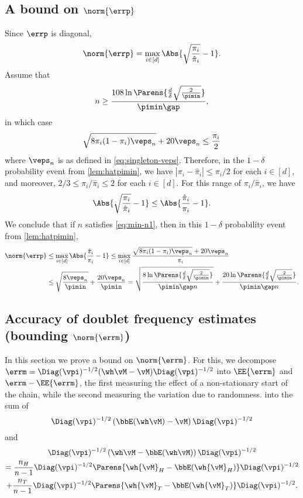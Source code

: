 \subsection{A bound on $\norm{\errp}$}

Since $\errp$ is diagonal,
\begin{align*}
  \norm{\errp}
  = \max_{i\in[d]}
  \Abs{
    \sqrt{\frac{\pi_i}{\hat\pi_i}} - 1
  }
  .
\end{align*}
Assume that
\begin{equation}
  n \geq \frac{108 \ln\Parens{\frac{d}\delta\sqrt{\frac{2}{\pimin}}}
  }{\pimin\gap}
  ,
  \label{eq:min-n1}
\end{equation}
in which case
\[
  \sqrt{8\pi_i(1-\pi_i) \veps_n} + 20\veps_n
  \leq \frac{\pi_i}{2}
\]
where $\veps_n$ is as defined in \cref{eq:singleton-veps}.
Therefore, in the $1-\delta$ probability event from
\cref{lem:hatpimin}, we have $|\pi_i - \hat\pi_i| \leq \pi_i/2$ for
each $i \in [d]$, and moreover, $2/3 \leq \pi_i/\hat\pi_i \leq 2$ for
each $i \in [d]$.
For this range of $\pi_i/\hat\pi_i$, we have
\[
  \Abs{ \sqrt{\frac{\pi_i}{\hat\pi_i}} - 1 }
  \leq 
  \Abs{ \frac{\hat\pi_i}{\pi_i} - 1 }
  .
\]
We conclude that if $n$ satisfies \cref{eq:min-n1}, then in this
$1-\delta$ probability event from \cref{lem:hatpimin},
\begin{align}
  \norm{\errp}
  & \leq
  \max_{i \in [d]}
  \Abs{
    \frac{\hat\pi_i}{\pi_i} - 1
  }
  \leq
  \max_{i \in [d]}
  \frac{
    \sqrt{8\pi_i(1-\pi_i) \veps_n} + 20 \veps_n
  }{\pi_i}
  \notag \\
  & \leq
  \sqrt{\frac{8\veps_n}{\pimin}} + \frac{20\veps_n}{\pimin}
  =
  \sqrt{
    \frac{
      8\ln\Parens{\frac{d}\delta\sqrt{\frac{2}{\pimin}}}
    }{
      \pimin\gap n
    }
  }
  +
  \frac{
    20\ln\Parens{\frac{d}\delta\sqrt{\frac{2}{\pimin}}}
  }{
    \pimin\gap n
  }
  .
  \label{eq:singletonbound}
\end{align}

\subsection{Accuracy of doublet frequency estimates (bounding $\norm{\errm}$)}
\label{sec:pairwise}
In this section we prove a bound on $\norm{\errm}$.
For this, we decompose
$\errm = \Diag(\vpi)^{-1/2}(\wh\vM-\vM)\Diag(\vpi)^{-1/2} $
into $\EE{\errm}$ and 
$\errm-\EE{\errm}$, the first measuring the effect of a non-stationary start of the chain,
while the second measuring the variation due to randomness.
into the sum of
\[
  \Diag(\vpi)^{-1/2}
  \left(\bbE( \wh\vM )- \vM\right)
  \Diag(\vpi)^{-1/2}
\]
and
\begin{multline*}
  \Diag(\vpi)^{-1/2} \left(\wh\vM- \bbE(\wh\vM)\right) \Diag(\vpi)^{-1/2}
  \\
  =
  \frac{n_H}{n-1}
  \Diag(\vpi)^{-1/2}\Parens{
    \wh{\vM}_H - \bbE(\wh{\vM}_H)
  }\Diag(\vpi)^{-1/2}
  \\
  + \frac{n_T}{n-1}
  \Diag(\vpi)^{-1/2}\Parens{
    \wh{\vM}_T - \bbE(\wh{\vM}_T)
  }\Diag(\vpi)^{-1/2}
  .
\end{multline*}
\fi

